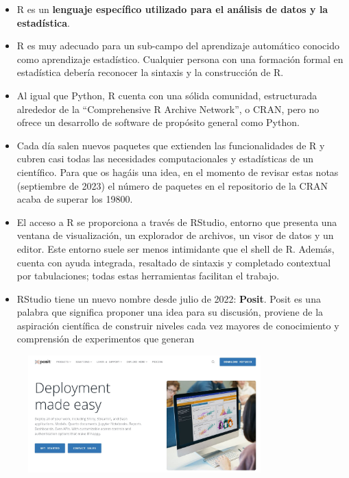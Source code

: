 \documentclass[
  letterpaper,
  DIV=11,
  numbers=noendperiod]{scrreprt}
\begin{document}
\begin{itemize}
\item
  R es un \textbf{lenguaje específico utilizado para el análisis de
  datos y la estadística}.
\item
  R es muy adecuado para un sub-campo del aprendizaje automático
  conocido como aprendizaje estadístico. Cualquier persona con una
  formación formal en estadística debería reconocer la sintaxis y la
  construcción de R.
\item
  Al igual que Python, R cuenta con una sólida comunidad, estructurada
  alrededor de la ``Comprehensive R Archive Network'', o CRAN, pero no
  ofrece un desarrollo de software de propósito general como Python.
\item
  Cada día salen nuevos paquetes que extienden las funcionalidades de R
  y cubren casi todas las necesidades computacionales y estadísticas de
  un científico. Para que os hagáis una idea, en el momento de revisar
  estas notas (septiembre de 2023) el número de paquetes en el
  repositorio de la CRAN acaba de superar los 19800.
\item
  El acceso a R se proporciona a través de RStudio, entorno que presenta
  una ventana de visualización, un explorador de archivos, un visor de
  datos y un editor. Este entorno suele ser menos intimidante que el
  shell de R. Además, cuenta con ayuda integrada, resaltado de sintaxis
  y completado contextual por tabulaciones; todas estas herramientas
  facilitan el trabajo.
\item
  RStudio tiene un nuevo nombre desde julio de 2022: \textbf{Posit}.
  Posit es una palabra que significa proponer una idea para su
  discusión, proviene de la aspiración científica de construir niveles
  cada vez mayores de conocimiento y comprensión de experimentos que
  generan
\end{itemize}

\begin{figure}

{\centering \includegraphics[width=0.8\textwidth,height=\textheight]{Figuras/posit.JPG}

}

\end{figure}
\end{document}
